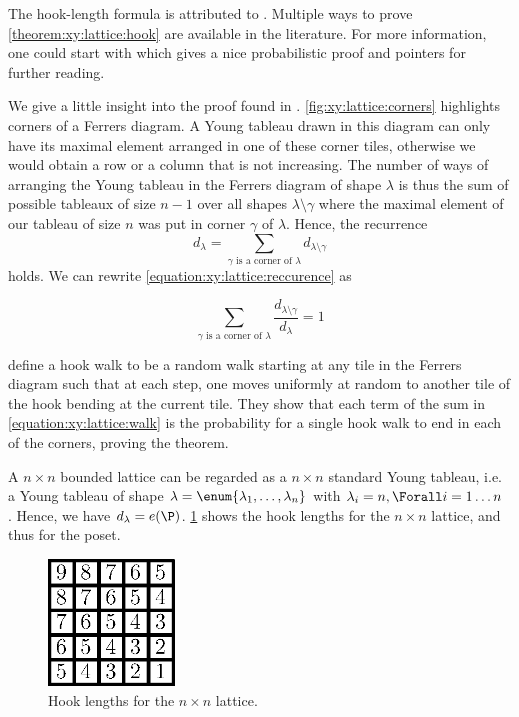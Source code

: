 The hook-length formula is attributed to \citet*{frame:1954}. Multiple ways to
prove \ref{theorem:xy:lattice:hook} are available in the literature. For more
information, one could start with \citet*{greene:1979} which gives a nice
probabilistic proof and pointers for further reading.

We give a little insight into the proof found in \citet*{greene:1979}.
\ref{fig:xy:lattice:corners} highlights corners of a Ferrers diagram. A Young
tableau drawn in this diagram can only have its maximal element arranged in
one of these corner tiles, otherwise we would obtain a row or a column that is
not increasing. The number of ways of arranging the Young tableau in the
Ferrers diagram of shape \(\lambda\) is thus the sum of possible tableaux of
size \(n-1\) over all shapes \(\lambda \setminus \gamma\) where the maximal
element of our tableau of size \(n\) was put in corner \(\gamma\) of
\(\lambda\). Hence, the recurrence
\begin{equation}\label{equation:xy:lattice:reccurence}
d_{\lambda} = \sum_{\gamma \text{ is a corner of } \lambda} d_{\lambda
\setminus \gamma}
\end{equation}
holds. We can rewrite \ref{equation:xy:lattice:reccurence} as

\begin{equation}\label{equation:xy:lattice:walk}
\sum_{\gamma \text{ is a corner of } \lambda} \frac{d_{\lambda
\setminus \gamma}}{d_{\lambda}} = 1
\end{equation}

\citet*{greene:1979} define a hook walk to be a random walk starting at
any tile in the Ferrers diagram such that at each step, one moves uniformly at
random to another tile of the hook bending at the current tile.
They show that each term of the sum in \ref{equation:xy:lattice:walk} is
the probability for a single hook walk to end in each of the corners, proving
the theorem.

A \( n \times n \) bounded lattice can be regarded as a \( n \times n \)
standard Young tableau, i.e. a Young tableau of shape
\( \lambda = \enum{ \lambda_1 , \ldots , \lambda_n } \)
with
\( \lambda_i = n, \Forall i = 1 \ldots n \)
. Hence, we have
\( d_{\lambda} = e(\P) \). \ref{fig:xy:lattice:xyhooks} shows the hook lengths
for the \( n \times n \) lattice, and thus for the \XY poset.

\begin{figure}
\centering
\includegraphics[width=0.3\textwidth]{fig/x+y/lattice/xyhooks}
\caption{Hook lengths for the \( n \times n \) lattice.}
\label{fig:xy:lattice:xyhooks}
\end{figure}

